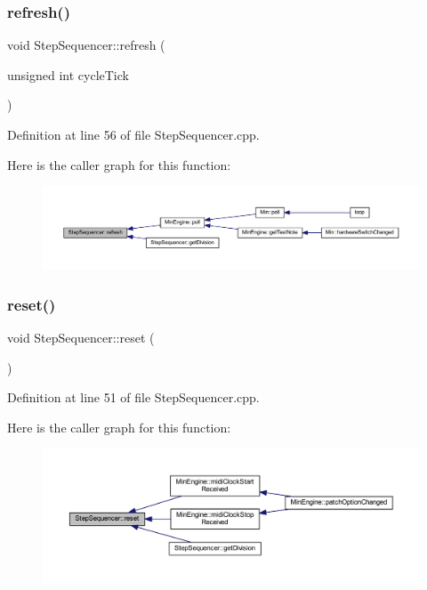 \subsubsection{\texorpdfstring{refresh()}{refresh()}}
{\footnotesize\ttfamily void Step\+Sequencer\+::refresh (\begin{DoxyParamCaption}\item[{unsigned int}]{cycle\+Tick }\end{DoxyParamCaption})}



Definition at line 56 of file Step\+Sequencer.\+cpp.

Here is the caller graph for this function\+:
\nopagebreak
\begin{figure}[H]
\begin{center}
\leavevmode
\includegraphics[width=350pt]{dc/d87/class_step_sequencer_a706e6a91c6b3ccd606876f57c334b311_icgraph}
\end{center}
\end{figure}
\mbox{\label{class_step_sequencer_afc3d99a316fa16322c1a582a49e8f272}} 
\subsubsection{\texorpdfstring{reset()}{reset()}}
{\footnotesize\ttfamily void Step\+Sequencer\+::reset (\begin{DoxyParamCaption}{ }\end{DoxyParamCaption})}



Definition at line 51 of file Step\+Sequencer.\+cpp.

Here is the caller graph for this function\+:
\nopagebreak
\begin{figure}[H]
\begin{center}
\leavevmode
\includegraphics[width=350pt]{dc/d87/class_step_sequencer_afc3d99a316fa16322c1a582a49e8f272_icgraph}
\end{center}
\end{figure}
\mbox{\label{class_step_sequencer_a5d62b641961ca9eaef9273efb9ed38b0}} 
